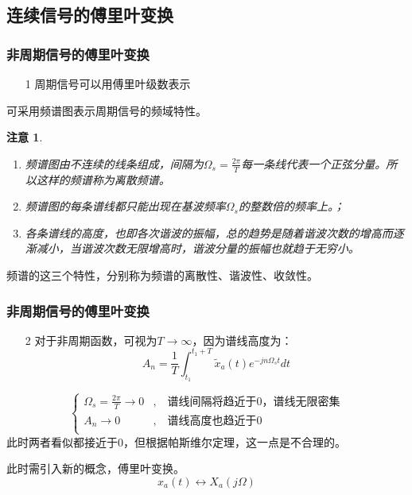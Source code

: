 \documentclass[notheorems,compress,mathserif,table]{beamer}
\newtheorem{zhuyi}{注意}
\begin{document}
\subsection{连续信号的傅里叶变换}
\begin{frame}[shrink]\frametitle{非周期信号的傅里叶变换}%
\begin{enumerate}
     \item [1]  周期信号可以用傅里叶级数表示\\
\end{enumerate}
                  \par\qquad 可采用频谱图表示周期信号的频域特性。
\begin{zhuyi}     %
         \begin{enumerate}
           \item  频谱图由不连续的线条组成，间隔为$\Omega_s = \frac{2\pi}{T}$每一条线代表一个正弦分量。所以这样的频谱称为离散频谱。
           \item 频谱图的每条谱线都只能出现在基波频率$\Omega_s$的整数倍的频率上。；
           \item 各条谱线的高度，也即各次谐波的振幅，总的趋势是随着谐波次数的增高而逐渐减小，当谐波次数无限增高时，谐波分量的振幅也就趋于无穷小。
         \end{enumerate}    
\end{zhuyi}    
 频谱的这三个特性，分别称为频谱的离散性、谐波性、收敛性。
 \newline
\end{frame}

\begin{frame}[shrink]\frametitle{非周期信号的傅里叶变换}%
\begin{enumerate}
     \item [2]  对于非周期函数，可视为$T \rightarrow \infty$，因为谱线高度为：
     $$ A_n = \frac{1}{T}\int_{t_1}^{t_1+T}\tilde{x}_a(t)e^{-jn\Omega_s t}dt $$
\end{enumerate}     
          $$
            \left\{ \begin{aligned}
                \Omega_s=\frac{2\pi}{T}\rightarrow 0  &, \quad \mbox{谱线间隔将趋近于0，谱线无限密集} \\
                A_n \rightarrow 0\quad\quad           &, \quad \mbox{谱线高度也趋近于0}\\
            \end{aligned} \right.
          $$
          此时两者看似都接近于0，但根据帕斯维尔定理，这一点是不合理的。\par
          此时需引入新的概念，傅里叶变换。
          $$x_a(t)\leftrightarrow X_a(j\Omega)$$
\end{frame}
\end{document}
